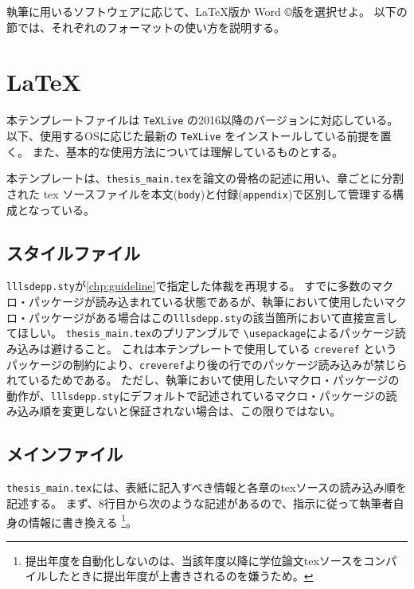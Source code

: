 		\noindent
		執筆に用いるソフトウェアに応じて、\LaTeX 版か Word \copyright 版を選択せよ。
		以下の節では、それぞれのフォーマットの使い方を説明する。

	\section{LaTeX}
		\label{sec:latex}

		本テンプレートファイルは \texttt{TeXLive} の2016以降のバージョンに対応している。
		以下、使用するOSに応じた最新の \texttt{TeXLive} をインストールしている前提を置く。
		また、基本的な使用方法については理解しているものとする。

		本テンプレートは、\texttt{thesis\_main.tex}を論文の骨格の記述に用い、章ごとに分割された tex ソースファイルを本文(\texttt{body})と付録(\texttt{appendix})で区別して管理する構成となっている。

		\subsection{スタイルファイル}
			\label{sub:style_file}

			\texttt{lllsdepp.sty}が\cref{chp:guideline}で指定した体裁を再現する。
			すでに多数のマクロ・パッケージが読み込まれている状態であるが、執筆において使用したいマクロ・パッケージがある場合はこの\texttt{lllsdepp.sty}の該当箇所において直接宣言してほしい。
			\texttt{thesis\_main.tex}のプリアンブルで \texttt{\textbackslash usepackage}によるパッケージ読み込みは避けること。
			これは本テンプレートで使用している \texttt{creveref} というパッケージの制約により、\texttt{creveref}より後の行でのパッケージ読み込みが禁じられているためである。
			ただし、執筆において使用したいマクロ・パッケージの動作が、\texttt{lllsdepp.sty}にデフォルトで記述されているマクロ・パッケージの読み込み順を変更しないと保証されない場合は、この限りではない。



		\subsection{メインファイル}
			\label{sub:メインファイル}

			\texttt{thesis\_main.tex}には、表紙に記入すべき情報と各章のtexソースの読み込み順を記述する。
			まず、8行目から次のような記述があるので、指示に従って執筆者自身の情報に書き換える
			\footnote{提出年度を自動化しないのは、当該年度以降に学位論文texソースをコンパイルしたときに提出年度が上書きされるのを嫌うため。}。

